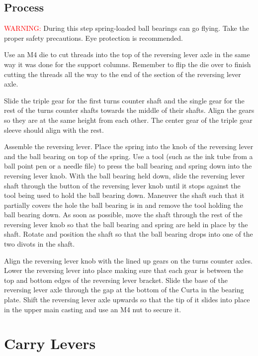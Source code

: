\documentclass[openany]{book}
\begin{document}
\section{Process}
\textcolor{red}{WARNING:} During this step spring-loaded ball bearings can go flying. Take the proper safety precautions. Eye protection is recommended.

Use an M4 die to cut threads into the top of the reversing lever axle in the same way it was done for the support columns. Remember to flip the die over to finish cutting the threads all the way to the end of the section of the reversing lever axle.

Slide the triple gear for the first turns counter shaft and the single gear for the rest of the turns counter shafts towards the middle of their shafts. Align the gears so they are at the same height from each other. The center gear of the triple gear sleeve should align with the rest.

Assemble the reversing lever. Place the spring into the knob of the reversing lever and the ball bearing on top of the spring. Use a tool (such as the ink tube from a ball point pen or a needle file) to press the ball bearing and spring down into the reversing lever knob. With the ball bearing held down, slide the reversing lever shaft through the button of the reversing lever knob until it stops against the tool being used to hold the ball bearing down. Maneuver the shaft such that it partially covers the hole the ball bearing is in and remove the tool holding the ball bearing down. As soon as possible, move the shaft through the rest of the reversing lever knob so that the ball bearing and spring are held in place by the shaft. Rotate and position the shaft so that the ball bearing drops into one of the two divots in the shaft.

Align the reversing lever knob with the lined up gears on the turns counter axles. Lower the reversing lever into place making sure that each gear is between the top and bottom edges of the reversing lever bracket. Slide the base of the reversing lever axle through the gap at the bottom of the Curta in the bearing plate. Shift the reversing lever axle upwards so that the tip of it slides into place in the upper main casting and use an M4 nut to secure it.





\chapter{Carry Levers}
\end{document}
